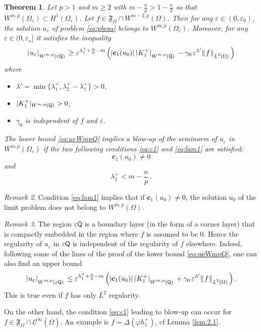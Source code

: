 \documentclass[titlepage,12pt]{amsart}
\newtheorem{theorem}{Theorem}[section]
\theoremstyle{definition}
\theoremstyle{remark}
\newtheorem{remark}[theorem]{Remark}
\numberwithin{equation}{section}
\newcommand{\ee}{\hskip0.15ex}
\newcommand{\dd}[1]{_{\raise-0.6ex\hbox{$\scriptstyle #1$}}}
\newcommand {\Norm}[2]{ \mathchoice
    {|\ee #1\ee|\dd{#2}\,}
    {| #1 |_{#2}}
    {| #1 |_{#2}}
    {| #1 |_{#2}} }
\newcommand {\DNorm}[2]{ \mathchoice
    {\|\ee #1\ee\|\dd{#2}\,}
    {\| #1 \|_{#2}}
    {\| #1 \|_{#2}}
    {\| #1 \|_{#2}} }
\newcommand{\sC}{{\mathscr C}}
\newcommand{\rQ}{{\mathsf{Q}}}
\newcommand {\gF}{\mathfrak{F}}
\begin{document}
\begin{theorem}
\label{th:Wmp}
Let $p>1$ and $m\ge2$ with $m-\frac{n}{p}>1-\frac{n}{2}$ so that $W^{m,p}(\Omega_\varepsilon)\subset H^1(\Omega_\varepsilon)$. Let $f\in\gF_\Omega\cap W^{m-2,p}(\Omega)$. Then for any $\varepsilon\in(0,\varepsilon_0)$, the solution $u_\varepsilon$ of problem \eqref{eq:pbeps} belongs to $W^{m,p}(\Omega_\varepsilon)$. Moreover, for any $\varepsilon\in(0,\varepsilon_\star]$ it 
satisfies the inequality
\begin{equation}
\label{eq:ueWmpQ}
   \Norm{u_\varepsilon}{W^{m,p}(\varepsilon\rQ)} \ge 
   \varepsilon^{\lambda^+_1+\frac{n}{p}-m} \left( 
   |\mathbf{c}_1(u_0)|\, \Norm{K^+_1}{W^{m,p}(\rQ)}
   - \gamma_0\,\varepsilon^{\lambda'} \DNorm{f}{L^2(\Omega)}
   \right)
\end{equation}
where
\begin{itemize}
\item[{\em(i)}] $\lambda'=\min\{\lambda^+_1,\lambda^+_2-\lambda^+_1\}>0$,
\item[{\em(ii)}] $\Norm{K^+_1}{W^{m,p}(\rQ)}>0$,
\item[{\em(iii)}] $\gamma_0$ is independent of $f$ and $\varepsilon$.
\end{itemize} 
The lower bound \eqref{eq:ueWmpQ} implies a blow-up of the seminorm of $u_\varepsilon$ in $W^{m,p}(\Omega_\varepsilon)$ if the two following conditions \eqref{eq:c1} and \eqref{eq:lam1} are satisfied:
\begin{equation}
\label{eq:c1}
   \mathbf{c}_1(u_0) \neq0
\end{equation} 
and
\begin{equation}
\label{eq:lam1}
   \lambda^+_1<m-\frac{n}{p}\,.
\end{equation}
\end{theorem}

\begin{remark}
Condition \eqref{eq:lam1} implies that if $\mathbf{c}_1(u_0) \neq0$, the solution $u_0$ of the limit problem does not belong to $W^{m,p}(\Omega)$.
\end{remark}

\begin{remark}
The region $\varepsilon\rQ$ is a boundary layer (in the form of a corner layer) that is compactly embedded in the region where $f$ is assumed to be $0$. Hence the regularity of $u_\varepsilon$ in $\varepsilon\rQ$ is independent of the regularity of $f$ elsewhere.
Indeed, following some of the lines of the proof of the lower bound \eqref{eq:ueWmpQ}, one can also find an upper bound
\begin{equation}
\label{eq:ueWmpQu}
   \Norm{u_\varepsilon}{W^{m,p}(\varepsilon\rQ)} \le 
   \varepsilon^{\lambda^+_1+\frac{n}{p}-m} \left( 
   |\mathbf{c}_1(u_0)|\, \Norm{K^+_1}{W^{m,p}(\rQ)}
   + \gamma_0\,\varepsilon^{\lambda'} \DNorm{f}{L^2(\Omega)}
   \right).
\end{equation}
This is true even if $f$ has only $L^{2}$ regularity.

On the other hand, the condition \eqref{eq:c1} leading to blow-up  can occur for $f\in\gF_\Omega\cap\sC^\infty(\overline\Omega)$. An example is $f=\Delta(\varphi h^+_1)$, cf Lemma \ref{lem:2.1}.
\end{remark}
\end{document}

